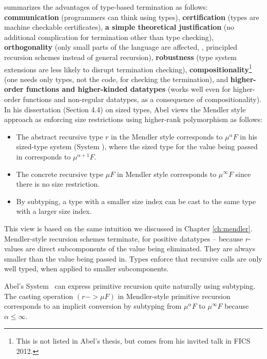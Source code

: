 \citet{abel06phd,Abel12talkFICS} summarizes the advantages of
type-based termination as follows:
\textbf{communication} (programmers can think using types),
\textbf{certification} (types are machine checkable certificates),
\textbf{a simple theoretical justification}
        (no additional complication for termination other than type checking),
\textbf{orthogonality} (only small parts of the language are affected,
        \eg, principled recursion schemes instead of general recursion),
\textbf{robustness} (type system extensions are less likely to
                        disrupt termination checking),
\textbf{compositionality}\footnote{This is not listed in Abel's thesis,
                                but comes from his invited talk in FICS 2012.}
        (one needs only types, not the code, for checking the termination), and
\textbf{higher-order functions and higher-kinded datatypes}
        (works well even for higher-order functions and non-regular datatypes,
        as a consequence of compositionality).
In his dissertation \cite{abel06phd} (Section 4.4) on sized types,
Abel views the Mendler style approach as enforcing size restrictions
using higher-rank polymorphism as follows:
\begin{itemize}
\item The abstract recursive type $r$ in the Mendler style corresponds to
        $\mu^\alpha F$ in his sized-type system (System \Fwhat),
        where the sized type
        for the value being passed in corresponds to $\mu^{\alpha+1} F$.
\item The concrete recursive type $\mu F$ in Mendler style corresponds to
        $\mu^\infty F$ since there is no size restriction.
\item By subtyping, a type with a smaller size index can be cast to
        the same type with a larger size index.
\end{itemize}
This view is based on the same intuition we discussed in
Chapter \ref{ch:mendler}. Mendler-style recursion schemes terminate, for
positive datatypes -- because $r$-values are direct subcomponents
of the value being eliminated. They are always smaller
than the value being passed in. Types enforce that recursive calls
are only well typed, when applied to smaller subcomponents.

Abel's System \Fwhat\ can express primitive recursion quite naturally
using subtyping. The casting operation $(r -> \mu F)$ in Mendler-style
primitive recursion corresponds to an implicit conversion by subtyping
from $\mu^\alpha F$ to $\mu^\infty F$ because $\alpha \leq \infty$.

